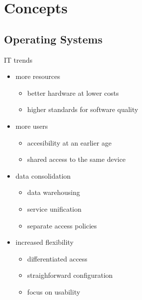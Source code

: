 \section{Concepts}

\subsection{Operating Systems}

\begin{frame}{IT trends}
	\begin{itemize}
		\item more resources
			\begin{itemize}
			\item better hardware at lower costs
			\item higher standards for software quality
			\end{itemize}
		\item more users
			\begin{itemize}
			\item accesibility at an earlier age
			\item shared access to the same device
			\end{itemize}
		\item data consolidation
			\begin{itemize}
			\item data warehousing
			\item service unification
			\item separate access policies
			\end{itemize}
		\item increased flexibility
			\begin{itemize}
			\item differentiated access
			\item straighforward configuration
			\item focus on usability
		\end{itemize}
	\end{itemize}
\end{frame}


